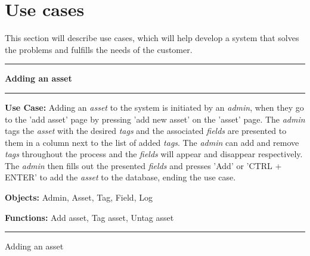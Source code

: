 \section{Use cases}\label{sc:usecases}
This section will describe use cases, which will help develop a system that solves the problems and fulfills the needs of the customer.

\begin{use_case}[H]
    \hrule
    \vskip 0.3cm
    \Large
    \begin{center}
    
        \textbf{Adding an asset}
        
    \end{center}
    \vskip 0.1cm
    \hrule
    \vskip 0.2cm
    \normalsize
    
    \textbf{Use Case:} Adding an \textit{asset} to the system is initiated by an \textit{admin}, when they go to the 'add asset' page by pressing 'add new asset' on the 'asset' page. The \textit{admin} tags the \textit{asset} with the desired \textit{tags} and the associated \textit{fields} are presented to them in a column next to the list of added \textit{tags}. The \textit{admin} can add and remove \textit{tags} throughout the process and the \textit{fields} will appear and disappear respectively. The \textit{admin} then fills out the presented \textit{fields} and presses 'Add' or 'CTRL + ENTER' to add the \textit{asset} to the database, ending the use case.
    
    \vskip 0.2cm
    
    \textbf{Objects:} Admin, Asset, Tag, Field, Log
    
    \vskip 0.2cm
    
    \textbf{Functions:} Add asset, Tag asset, Untag asset
    
    \vskip 0.4cm
    \hrule
    \vskip 0.2cm
    \caption{Adding an asset} \label{use_case:adding_an_asset}
\end{use_case}



